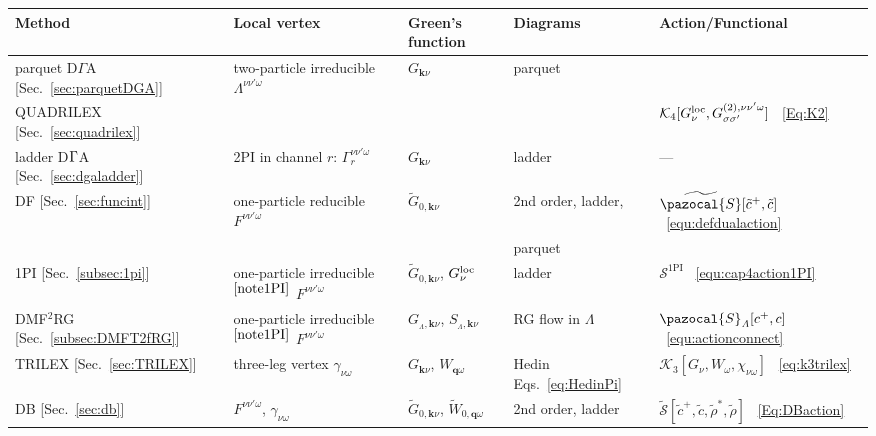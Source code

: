 \documentclass[rmp,aps,reprint,amsmath,amssymb,superscriptaddress,showpacs,nofootinbib]{revtex4-1}
\newcommand{\kv}{\ensuremath{\mathbf{k}}}
\newcommand{\qv}{\ensuremath{\mathbf{q}}}
\begin{document}
\begin{table*}[tb]
\setlength\extrarowheight{5pt}
\begin{center}
  \begin{tabular}{|l | l | l | l | l|}
  \hline
    Method  & Local  vertex & Green's function &  Diagrams & Action/Functional\\
  \hline
    parquet D$\Gamma$A  [Sec.~\ref{sec:parquetDGA}]  & two-particle irreducible  $\Lambda^{\nu\nu'\omega}$ & $G_{{\mathbf k}\nu}$ & parquet & \\
    QUADRILEX [Sec.~\ref{sec:quadrilex}] &&&& $\mathcal{K}_{4}[G^{\rm loc}_\nu,G_{\sigma\sigma'}^{(2),\nu\nu'\omega}]$ ~\eqref{Eq:K2} \\
  \hline
    ladder D$\rm \Gamma$A  [Sec.~\ref{sec:dgaladder}] & 2PI in channel $r$: $\Gamma_{r}^{\nu\nu'\omega}$ & $G_{{\mathbf k}\nu}$ &  ladder&  --- \\
  \hline
    DF [Sec.~\ref{sec:funcint}] &   one-particle reducible $F^{\nu\nu'\omega}$  & $\widetilde{G}_{0, {{\mathbf k}\nu}}$ &2nd order, ladder,&  $\widetilde{\pazocal{S}}[\tilde{c}^+,\tilde{c}]$  ~\eqref{equ:defdualaction} \\
    & & & parquet & \\
  \hline
    1PI  [Sec.~\ref{subsec:1pi}] &  one-particle irreducible$^{\rm \ref{note1PI}}$ $F^{\nu\nu'\omega}$ & $\widetilde{G}_{0, {{\mathbf k}\nu}}$, $G_{\nu}^{\rm loc}$ & ladder & $\mathcal{S}^{\text{1PI}}$  ~\eqref{equ:cap4action1PI} \\
  \hline
    DMF$^2$RG  [Sec.~\ref{subsec:DMFT2fRG}] &  one-particle irreducible$^{\rm \ref{note1PI}}$ $F^{\nu\nu'\omega}$ & $G_{_\mathit{\Lambda}, {{\mathbf k}\nu}}$, $S_{_\mathit{\Lambda},{{\mathbf k}\nu}}$ & RG flow in $\mathit{\Lambda}$& $\pazocal{S}_\mathit{\Lambda} [c^+,c]$  ~\eqref{equ:actionconnect}\\
  \hline
  \hline
    TRILEX [Sec.~\ref{sec:TRILEX}] & three-leg vertex $\gamma_{\nu \omega}$ & ${G}_{\kv\nu}$, ${W}_{\qv\omega}$ & Hedin Eqs.~\eqref{eq:HedinPi} & $\mathcal{K}_{3}[G_\nu,W_{\omega},\chi_{\nu\omega}]$ ~\eqref{eq:k3trilex} \\
  \hline
    DB [Sec.~\ref{sec:db}] &   $F^{\nu\nu'\omega}$, $\gamma_{\nu \omega}$ & $\widetilde{G}_{0,\kv\nu}$, $\widetilde{W}_{0,\qv\omega}$ & 2nd order, ladder &  $\widetilde{\mathcal{S}}[\widetilde{c}^+,\widetilde{c},\widetilde{\rho}^*,\widetilde{\rho}]$  ~\eqref{Eq:DBaction} \\
  \hline
  \end{tabular}
\end{center}

\end{table*}
\end{document}
